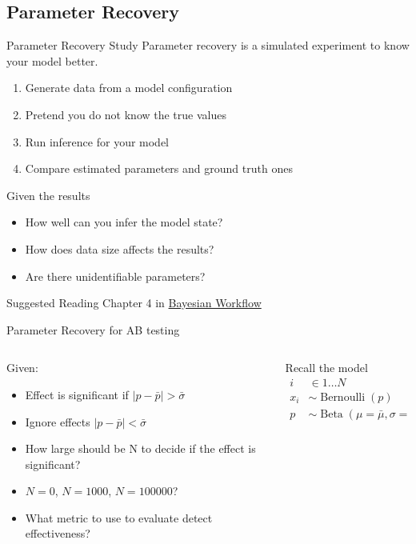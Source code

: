 \documentclass{beamer}
\begin{document}
\subsection{Parameter Recovery}
\begin{frame}{Parameter Recovery Study}
    Parameter recovery is a simulated experiment to know your model better. 
    \begin{enumerate}
        \item Generate data from a model configuration
        \item Pretend you do not know the true values
        \item Run inference for your model
        \item Compare estimated parameters and ground truth ones
    \end{enumerate}
    Given the results
    \begin{itemize}
        \item How well can you infer the model state?
        \item<alert@2> How does data size affects the results?
        \item Are there unidentifiable parameters? 
    \end{itemize}
    \begin{block}{Suggested Reading}
    Chapter 4 in \href{https://arxiv.org/abs/2011.01808}{Bayesian Workflow}
    \end{block}
\end{frame}
\begin{frame}{Parameter Recovery for AB testing}
\begin{columns}
\begin{column}{0.6\linewidth}
Given:
\begin{itemize}
    \item<1-> Effect is significant if $|p-\bar p|>\bar \sigma$
    \item<2-> Ignore effects $|p-\bar p|<\bar \sigma$
    \item<3-> How large should be N to decide if the effect is significant?
    \item<4-> $N=0$, $N=1000$, $N=100000$?
    \item<5-> What metric to use to evaluate detect effectiveness?
\end{itemize}
\end{column}
\begin{column}{0.4\linewidth}
Recall the model
\begin{align*}
    i&\in 1\dots N\\
    x_i & \sim \operatorname{Bernoulli}(p)\\
    p &\sim \operatorname{Beta}(\mu=\bar\mu, \sigma=\bar\sigma)
\end{align*}
\end{column}
\end{columns}
\end{frame}
\end{document}

